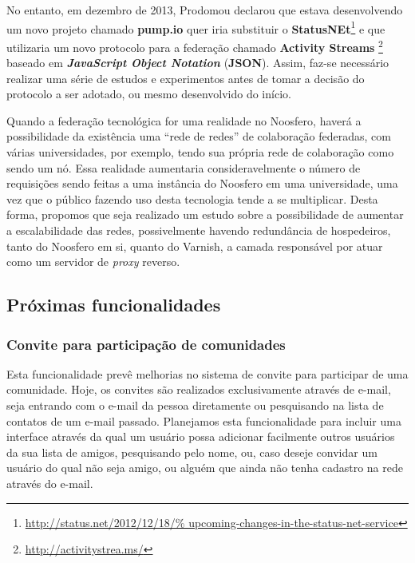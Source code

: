 No entanto, em dezembro de 2013, Prodomou declarou que estava desenvolvendo
um novo projeto chamado \textbf{pump.io} quer iria substituir o
\textbf{StatusNEt}\footnote{\url{http://status.net/2012/12/18/%
upcoming-changes-in-the-status-net-service}} e que utilizaria um novo
protocolo para a federação chamado \textbf{Activity Streams}%
\footnote{\url{http://activitystrea.ms/}} baseado em \textbf{\textit{%
JavaScript Object Notation}} (\textbf{JSON}).
%
Assim, faz-se necessário realizar uma série de estudos e experimentos
antes de tomar a decisão do protocolo a ser adotado, ou mesmo desenvolvido
do início.

Quando a federação tecnológica for uma realidade no Noosfero, haverá a
possibilidade da existência uma ``rede de redes'' de colaboração federadas,
com várias universidades, por exemplo, tendo sua própria rede de colaboração
como sendo um nó.
%
Essa realidade aumentaria consideravelmente o número de requisições sendo
feitas a uma instância do Noosfero em uma universidade, uma vez que o público
fazendo uso desta tecnologia tende a se multiplicar.
%
Desta forma, propomos que seja realizado um estudo sobre a possibilidade
de aumentar a escalabilidade das redes, possivelmente havendo redundância
de hospedeiros, tanto do Noosfero em si, quanto do Varnish, a camada
responsável por atuar como um servidor de \textit{proxy} reverso.


\subsection{Próximas funcionalidades}

\subsubsection{Convite para participação de comunidades}

Esta funcionalidade prevê melhorias no sistema de convite para participar de
uma comunidade. Hoje, os convites são realizados
exclusivamente através de e-mail, seja entrando com o e-mail da pessoa
diretamente ou pesquisando na lista de contatos de um e-mail passado.
%
Planejamos esta funcionalidade para incluir uma interface através da qual um
usuário possa adicionar facilmente outros usuários da sua lista de amigos,
pesquisando pelo nome, ou, caso deseje convidar um usuário do qual não seja
amigo, ou alguém que ainda não tenha cadastro na rede através do e-mail.


